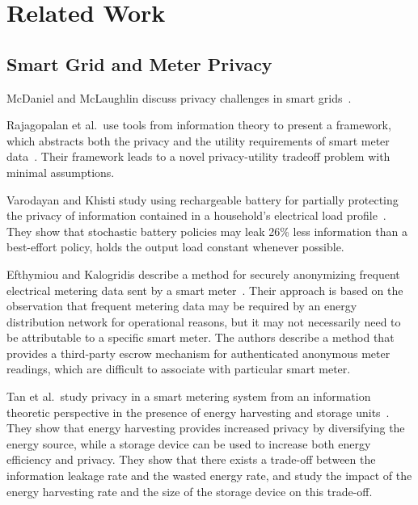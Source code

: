 \section{Related Work}
\label{sec:related}

\subsection{Smart Grid and Meter Privacy}

McDaniel and McLaughlin discuss privacy challenges in smart grids~\cite{mcdaniel2009security}.

Rajagopalan et al.\ use tools from information theory to present a framework, which abstracts both the privacy and the utility requirements of smart meter data~\cite{rajagopalan2011smart,sankar2013smart}. Their framework leads to a novel privacy-utility tradeoff problem with minimal assumptions. %

Varodayan and Khisti study using rechargeable battery for partially protecting the privacy of information contained in a household's electrical load profile~\cite{varodayan2011smart}.
They show that stochastic battery policies may leak 26\% less information than a best-effort policy, holds the output load constant whenever possible.

Efthymiou and Kalogridis describe a method for securely anonymizing frequent electrical metering data sent by a smart meter~\cite{efthymiou2010smart}. 
Their approach is based on the observation that frequent metering data may be required by an energy distribution network for operational reasons, but it may not necessarily need to be attributable to a specific smart meter.
The authors describe a method that provides a third-party escrow mechanism for authenticated anonymous meter readings, which are difficult to associate with particular smart meter.

Tan et al.\ study privacy in a smart metering system from an information theoretic perspective in the presence of energy harvesting and storage units~\cite{tan2013increasing}. 
They show that energy harvesting provides increased privacy by diversifying the energy source, while a storage device can be used to increase both energy efficiency and privacy. 
They show that there exists a trade-off between the information leakage rate and the wasted energy rate, and study the impact of the energy harvesting rate and the size of the storage device on this trade-off.

